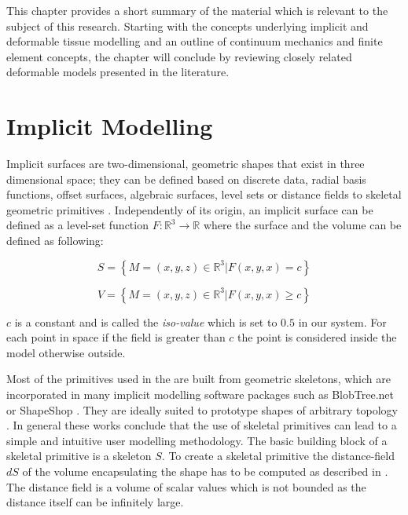 \label{chapter:background}

\newlength{\savedunitlength}
\setlength{\unitlength}{2em}
This chapter provides a short summary of the material which is relevant to the subject of this research. Starting with the concepts underlying 
implicit and deformable tissue modelling and an outline of continuum mechanics and finite element concepts, the chapter will conclude by reviewing closely related 
deformable models presented in the literature. 

\section{Implicit Modelling}
\label{sec:implicitmodellingintro}
Implicit surfaces are two-dimensional, geometric shapes that exist in three dimensional space; they can be defined based on discrete data, 
radial basis functions, offset surfaces, algebraic surfaces, level sets or distance fields to skeletal geometric primitives \cite{Bloomenthal1997}.
Independently of its origin, an implicit surface can be defined as a level-set function $F:\mathbb{R}^3 \rightarrow \mathbb{R}$ where the surface 
and the volume can be defined as following:

\begin{equation}
S = \left\{M = (x,y,z) \in \mathbb{R}^3 | F(x,y,x) = c\right\}
\end{equation}

\begin{equation}
V = \left\{M = (x,y,z) \in \mathbb{R}^3 | F(x,y,x) \geq c\right\}
\end{equation}

$c$ is a constant and is called the \textit{iso-value} which is set to $0.5$ in our system. For each point in space if the field is greater than
$c$ the point is considered inside the model otherwise outside. 

Most of the primitives used in the \blob are built from geometric skeletons, which are incorporated in many implicit modelling software packages 
such as BlobTree.net \cite{Groot2008} or ShapeShop \cite{Schmidt2006}. They are ideally suited to prototype shapes of arbitrary topology 
\cite{Bloomenthal1997}. In general these works conclude that the use of skeletal primitives can lead to a simple and intuitive user modelling 
methodology. The basic building block of a skeletal primitive is a skeleton $S$. To create a skeletal primitive the distance-field $dS$ of the 
volume encapsulating the shape has to be computed as described in \cite{Barbier2004}. The distance field is a volume of scalar values which is 
not bounded as the distance itself can be infinitely large.

